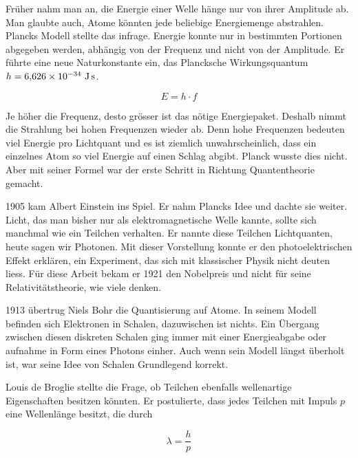 	



	
	
	
	Früher nahm man an, die Energie einer Welle hänge nur von ihrer Amplitude ab. 
	Man glaubte auch, Atome könnten jede beliebige Energiemenge abstrahlen. Plancks Modell stellte das infrage. 
	Energie konnte nur in bestimmten Portionen abgegeben werden, abhängig von der Frequenz und nicht von der Amplitude.
    Er führte eine neue Naturkonstante ein, das Plancksche Wirkungsquantum $h = 6{,}626 \times 10^{-34} \ \text{J\,s}$. 
	
	
	\begin{equation}
		E = h \cdot f
	\end{equation}
	 
	 
	Je höher die Frequenz, desto grösser ist das nötige Energiepaket. 
	Deshalb nimmt die Strahlung bei hohen Frequenzen wieder ab. Denn hohe Frequenzen bedeuten viel Energie pro Lichtquant und es ist ziemlich unwahrscheinlich, dass ein einzelnes Atom so viel Energie auf einen Schlag abgibt. 
	Planck wusste dies nicht. 
	Aber mit seiner Formel war der erste Schritt in Richtung Quantentheorie gemacht.
	
	
	
	1905 kam Albert Einstein ins Spiel. 
	Er nahm Plancks Idee und dachte sie weiter. 
	Licht, das man bisher nur als elektromagnetische Welle kannte, sollte sich manchmal wie ein Teilchen verhalten.
	Er nannte diese Teilchen Lichtquanten, heute sagen wir Photonen. 
	Mit dieser Vorstellung konnte er den photoelektrischen Effekt erklären, ein Experiment, das sich mit klassischer Physik nicht deuten liess. 
	Für diese Arbeit bekam er 1921 den Nobelpreis und nicht für seine Relativitätstheorie, wie viele denken.
	 
	
	1913 übertrug Niels Bohr die Quantisierung auf Atome. 
	In seinem Modell befinden sich Elektronen in Schalen, dazuwischen ist nichts. 
	Ein Übergang zwischen diesen diskreten Schalen ging immer mit einer Energieabgabe oder aufnahme in Form eines Photons einher. 
	Auch wenn sein Modell längst überholt ist, war seine Idee von Schalen Grundlegend korrekt. 

	
	Louis de Broglie stellte die Frage, ob Teilchen ebenfalls wellenartige Eigenschaften besitzen könnten. 
	Er postulierte, dass jedes Teilchen mit Impuls $p$ eine Wellenlänge besitzt, die durch
	
	
	\begin{equation}
		\lambda = \frac{h}{p}
	\end{equation}
	

